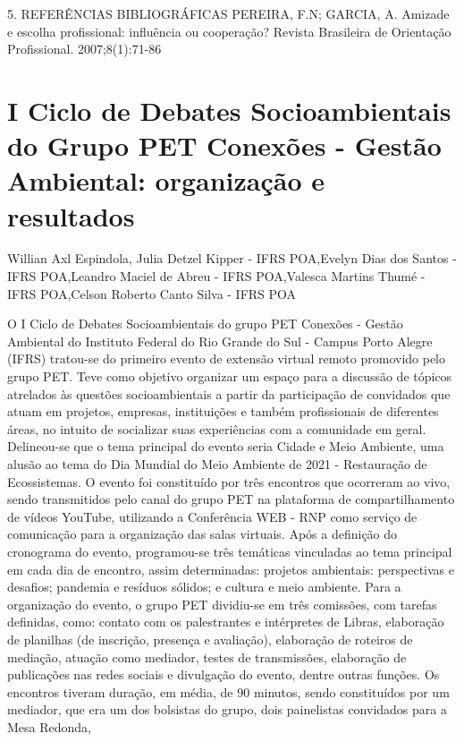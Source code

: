5. REFERÊNCIAS BIBLIOGRÁFICAS
PEREIRA, F.N; GARCIA, A. Amizade e escolha profissional: influência ou cooperação? Revista Brasileira de Orientação Profissional. 2007;8(1):71-86



\section{I Ciclo de Debates Socioambientais do Grupo PET Conexões - Gestão Ambiental: organização e resultados}

Willian Axl Espindola, Julia Detzel Kipper - IFRS POA,Evelyn Dias dos Santos - IFRS POA,Leandro Maciel de Abreu - IFRS POA,Valesca Martins Thumé - IFRS POA,Celson Roberto Canto Silva - IFRS POA

O I Ciclo de Debates Socioambientais do grupo PET Conexões - Gestão Ambiental do Instituto
Federal do Rio Grande do Sul - Campus Porto Alegre (IFRS) tratou-se do primeiro evento de
extensão virtual remoto promovido pelo grupo PET. Teve como objetivo organizar um espaço
para a discussão de tópicos atrelados às questões socioambientais a partir da participação de
convidados que atuam em projetos, empresas, instituições e também profissionais de diferentes
áreas, no intuito de socializar suas experiências com a comunidade em geral. Delineou-se que o
tema principal do evento seria Cidade e Meio Ambiente, uma alusão ao tema do Dia Mundial do
Meio Ambiente de 2021 - Restauração de Ecossistemas.
O evento foi constituído por três encontros que ocorreram ao vivo, sendo transmitidos pelo canal
do grupo PET na plataforma de compartilhamento de vídeos YouTube, utilizando a Conferência
WEB - RNP como serviço de comunicação para a organização das salas virtuais. Após a
definição do cronograma do evento, programou-se três temáticas vinculadas ao tema principal
em cada dia de encontro, assim determinadas: projetos ambientais: perspectivas e desafios;
pandemia e resíduos sólidos; e cultura e meio ambiente.
Para a organização do evento, o grupo PET dividiu-se em três comissões, com tarefas definidas,
como: contato com os palestrantes e intérpretes de Libras, elaboração de planilhas (de inscrição,
presença e avaliação), elaboração de roteiros de mediação, atuação como mediador, testes de
transmissões, elaboração de publicações nas redes sociais e divulgação do evento, dentre outras
funções. Os encontros tiveram duração, em média, de 90 minutos, sendo constituídos por um
mediador, que era um dos bolsistas do grupo, dois painelistas convidados para a Mesa Redonda,
